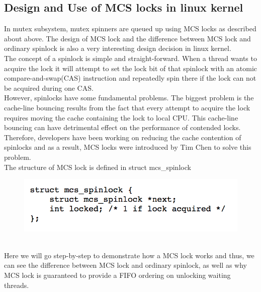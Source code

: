 \documentclass[10pt]{sigplanconf}
\begin{document}
\subsection{Design and Use of MCS locks in linux kernel}
In mutex subsystem, mutex spinners are queued up using MCS locks as described about above. 
The design of MCS lock and the difference between MCS lock and ordinary spinlock is also a very interesting design decision in linux kernel.\\
The concept of a spinlock is simple and straight-forward. When a thread wants to acquire the lock it will attempt to set the lock bit of that spinlock with an atomic compare-and-swap(CAS) instruction and repeatedly spin there if the lock can not be acquired during one CAS. \\
However, spinlocks have some fundamental problems. The biggest problem is the cache-line bouncing results from the fact that every attempt to acquire the lock requires moving the cache containing the lock to local CPU. This cache-line bouncing can have detrimental effect on the performance of contended locks. Therefore, developers have been working on reducing the cache contention of spinlocks and as a result, MCS locks were introduced by Tim Chen to solve this problem.\\
The structure of MCS lock is defined in struct mcs\_spinlock\\
\begin{figure}[h!]
	\includegraphics[scale=0.7]{mcslock0.png}
\end{figure}\\
Here we will go step-by-step to demonstrate how a MCS lock works and thus, we can see the difference between MCS lock and ordinary spinlock, as well as why MCS lock is guaranteed to provide a FIFO ordering on unlocking waiting threads. \\
\end{document}
